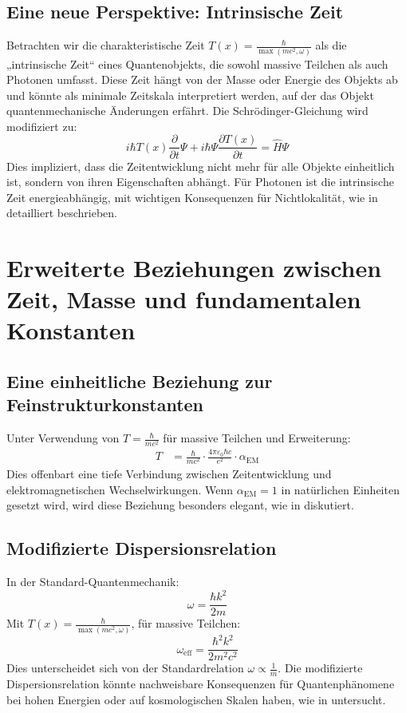 \documentclass[12pt,a4paper]{article}
\newcommand{\Tfield}{T(x)}
\newcommand{\alphaEM}{\alpha_{\text{EM}}}
\begin{document}
	\subsection{Eine neue Perspektive: Intrinsische Zeit}
	Betrachten wir die charakteristische Zeit \( \Tfield = \frac{\hbar}{\max(m c^2, \omega)} \) als die „intrinsische Zeit“ eines Quantenobjekts, die sowohl massive Teilchen als auch Photonen umfasst. Diese Zeit hängt von der Masse oder Energie des Objekts ab und könnte als minimale Zeitskala interpretiert werden, auf der das Objekt quantenmechanische Änderungen erfährt. Die Schrödinger-Gleichung wird modifiziert zu:
	\begin{equation}
		i\hbar \Tfield \frac{\partial}{\partial t} \Psi + i\hbar \Psi \frac{\partial \Tfield}{\partial t} = \hat{H} \Psi
	\end{equation}
	Dies impliziert, dass die Zeitentwicklung nicht mehr für alle Objekte einheitlich ist, sondern von ihren Eigenschaften abhängt. Für Photonen ist die intrinsische Zeit energieabhängig, mit wichtigen Konsequenzen für Nichtlokalität, wie in \cite{pascher_photons_2025} detailliert beschrieben.
	
	\section{Erweiterte Beziehungen zwischen Zeit, Masse und fundamentalen Konstanten}
	\subsection{Eine einheitliche Beziehung zur Feinstrukturkonstanten}
	Unter Verwendung von \( T = \frac{\hbar}{mc^2} \) für massive Teilchen und Erweiterung:
	\begin{align}
		T &= \frac{\hbar}{mc^2} \cdot \frac{4\pi\varepsilon_0\hbar c}{e^2} \cdot \alphaEM
	\end{align}
	Dies offenbart eine tiefe Verbindung zwischen Zeitentwicklung und elektromagnetischen Wechselwirkungen. Wenn \(\alphaEM = 1\) in natürlichen Einheiten gesetzt wird, wird diese Beziehung besonders elegant, wie in \cite{pascher_alphabeta_2025} diskutiert.
	
	\subsection{Modifizierte Dispersionsrelation}
	In der Standard-Quantenmechanik:
	\begin{equation}
		\omega = \frac{\hbar k^2}{2m}
	\end{equation}
	Mit \( \Tfield = \frac{\hbar}{\max(m c^2, \omega)} \), für massive Teilchen:
	\begin{equation}
		\omega_{\text{eff}} = \frac{\hbar^2 k^2}{2 m^2 c^2}
	\end{equation}
	Dies unterscheidet sich von der Standardrelation \( \omega \propto \frac{1}{m} \). Die modifizierte Dispersionsrelation könnte nachweisbare Konsequenzen für Quantenphänomene bei hohen Energien oder auf kosmologischen Skalen haben, wie in \cite{pascher_emergente_gravitation_2025} untersucht.
	
\end{document}
